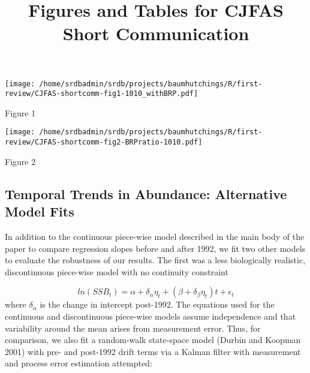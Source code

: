 \documentclass[letterpaper,12pt]{article}
\title{Figures and Tables for CJFAS Short Communication}
\begin{document}
\maketitle{}



\clearpage

\begin{center}
\texttt{[image: /home/srdbadmin/srdb/projects/baumhutchings/R/first-review/CJFAS-shortcomm-fig1-1010\_withBRP.pdf]}
\end{center}
\noindent 
Figure 1

\begin{center}
\texttt{[image: /home/srdbadmin/srdb/projects/baumhutchings/R/first-review/CJFAS-shortcomm-fig2-BRPratio-1010.pdf]}
\end{center}
\noindent 
Figure 2


\clearpage

\subsection*{Temporal Trends in Abundance: Alternative Model Fits}
In addition to the continuous piece-wise model described in the main
body of the paper to compare regression slopes before and after 1992,
we fit two other models to evaluate the robustness of our results. The
first was a less biologically realistic, discontinuous piece-wise
model with no continuity constraint 

\begin{equation}
ln\left(SSB_{t}\right) = \alpha + \delta_{\alpha}\eta_{t} + \left(\beta + \delta_{\beta}\eta_{t}\right)t + \epsilon_{t}
\end{equation}
where $\delta_{\alpha}$ is the change in intercept post-1992. The equations
used for the continuous and discontinuous piece-wise models assume
independence and that variability around the mean arises from
measurement error. Thus, for comparison, we also fit a random-walk
state-space model (Durbin and Koopman 2001) with pre- and post-1992
drift terms via a Kalman filter with measurement and process error
estimation attempted: 
\end{document}
